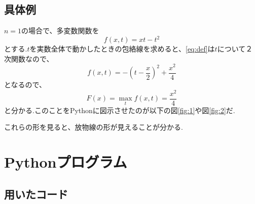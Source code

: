 \documentclass[11pt,a4j,fleqn]{jarticle}
\begin{document}
\subsection{具体例}

$n=1$の場合で、多変数関数を
\begin{equation}
 f(x,t)=xt-t^2 \label{eq:def}
\end{equation}
とする.$t$を実数全体で動かしたときの包絡線を求めると、\eqref{eq:def}は$t$について２次関数なので、
\begin{equation*}
 f(x,t)=-\left(t-\frac{x}{2}\right)^2+\frac{x^2}{4}
\end{equation*}
となるので、
\begin{equation*}
 F(x)=\max_t f(x,t)=\frac{x^2}{4}
\end{equation*}
と分かる.このことをPythonに図示させたのが以下の図\ref{fig:1}や図\ref{fig:2}だ.

これらの形を見ると、放物線の形が見えることが分かる.

\section{Pythonプログラム}

\subsection{用いたコード}
\end{document}
